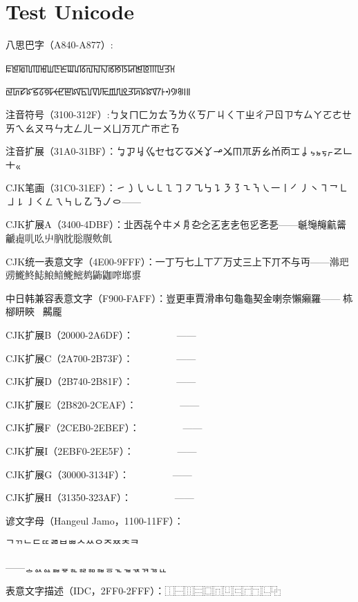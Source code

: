 
\section{Test Unicode}

八思巴字（A840-A877）:

{\psp ꡀꡁꡂꡃꡄꡅꡆꡇꡈꡉꡊꡋꡌꡍꡎꡏꡐꡑꡒꡓꡔꡕꡖꡗꡘ

ꡙꡚꡛꡜꡝꡞꡟꡠꡡꡢꡣꡤꡥꡦꡧꡨꡩꡪꡫꡬꡭꡮꡯꡰꡱꡲꡳ꡴꡵꡶꡷}


注音符号（3100-312F）:\*ㄅㄆㄇㄈㄉㄊㄋㄌㄍㄎㄏㄐㄑㄒㄓㄔㄕㄖㄗㄘㄙㄚㄛㄜㄝㄞㄟㄠㄡㄢㄣㄤㄥㄦㄧㄨㄩㄪㄫㄬㄭㄮㄯ

注音扩展（31A0-31BF）：ㆠㆡㆢㆣㆤㆥㆦㆧㆨㆩㆪㆫㆬㆭㆮㆯㆰㆱㆲㆳㆴㆵㆶㆷㆸㆹㆺㆻㆼㆽㆾㆿ

CJK笔画（31C0-31EF）：㇀㇁㇂㇃㇄㇅㇆㇇㇈㇉㇊㇋㇌㇍㇎㇏㇐㇑㇒㇓㇔㇕㇖㇗㇘㇙㇚㇛㇜㇝㇞㇟㇠㇡㇢㇣——㇯

CJK扩展A（3400-4DBF）：㐀㐁㐂㐃㐄㐅㐆㐇㐈㐉㐊㐋㐌㐍㐎㐏——䶰䶱䶲䶳䶴䶵䶶䶷䶸䶹䶺䶻䶼䶽䶾䶿

CJK统一表意文字（4E00-9FFF）：一丁丂七丄丅丆万丈三上下丌不与丏——鿰鿱鿲鿳鿴鿵鿶鿷鿸鿹鿺鿻鿼鿽鿾鿿

中日韩兼容表意文字（F900-FAFF）：豈更車賈滑串句龜龜契金喇奈懶癩羅——𢡄𣏕㮝䀘䀹𥉉𥳐𧻓齃龎\*	

CJK扩展B（20000-2A6DF）：𠀀𠀁𠀂𠀃𠀄𠀅𠀆𠀇𠀈𠀉𠀊𠀋𠀌𠀍𠀎𠀏——𪛐𪛑𪛒𪛓𪛔𪛕𪛖𪛗𪛘𪛙𪛚𪛛𪛜𪛝𪛞𪛟

CJK扩展C（2A700-2B73F）：𪜀𪜁𪜂𪜃𪜄𪜅𪜆𪜇𪜈𪜉𪜊𪜋𪜌𪜍𪜎𪜏——𫜰𫜱𫜲𫜳𫜴𫜵𫜶𫜷𫜸𫜹\*

CJK扩展D（2B740-2B81F）：𫝀𫝁𫝂𫝃𫝄𫝅𫝆𫝇𫝈𫝉𫝊𫝋𫝌𫝍𫝎𫝏——𫠐𫠑𫠒𫠓𫠔𫠕𫠖𫠗𫠘𫠙𫠚𫠛𫠜𫠝\*

CJK扩展E（2B820-2CEAF）：𫠠𫠡𫠢𫠣𫠤𫠥𫠦𫠧𫠨𫠩𫠪𫠫𫠬𫠭𫠮𫠯——𬺐𬺑𬺒𬺓𬺔𬺕𬺖𬺗𬺘𬺙𬺚𬺛𬺜𬺝𬺞𬺟𬺠𬺡\*

CJK扩展F（2CEB0-2EBEF）：𬺰𬺱𬺲𬺳𬺴𬺵𬺶𬺷𬺸𬺹𬺺𬺻𬺼𬺽𬺾𬺿——𮯐𮯑𮯒𮯓𮯔𮯕𮯖𮯗𮯘𮯙𮯚𮯛𮯜𮯝𮯞𮯟𮯠\*

CJK扩展I（2EBF0-2EE5F）：𮯰𮯱𮯲𮯳𮯴𮯵𮯶𮯷𮯸𮯹𮯺𮯻𮯼𮯽𮯾𮯿——𮹐𮹑𮹒𮹓𮹔𮹕𮹖𮹗𮹘𮹙𮹚𮹛𮹜𮹝\*

CJK扩展G（30000-3134F）：𰀀𰀁𰀂𰀃𰀄𰀅𰀆𰀇𰀈𰀉𰀊𰀋𰀌𰀍𰀎𰀏——𱍀𱍁𱍂𱍃𱍄𱍅𱍆𱍇𱍈𱍉𱍊\*

CJK扩展H（31350-323AF）：𱍐𱍑𱍒𱍓𱍔𱍕𱍖𱍗𱍘𱍙𱍚𱍛𱍜𱍝𱍞𱍟——𲎠𲎡𲎢𲎣𲎤𲎥𲎦𲎧𲎨𲎩𲎪𲎫𲎬𲎭𲎮𲎯

谚文字母（Hangeul Jamo，1100-11FF）：
{\oldjamo ᄀᄁᄂᄃᄄᄅᄆᄇᄈᄉᄊᄋᄌᄍᄎᄏ

——ᇰᇱᇲᇳᇴᇵᇶᇷᇸᇹᇺᇻᇼᇽᇾᇿ}

表意文字描述（IDC，2FF0-2FFF）：⿰⿱⿲⿳⿴⿵⿶⿷⿸⿹⿺⿻⿼⿽⿾⿿

